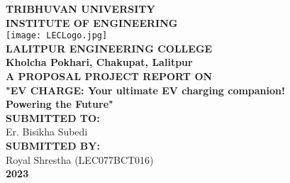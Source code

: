 {
	\thispagestyle{empty}
	\centering
   \fontsize{14pt}{14pt}\selectfont
        	\textbf{\MakeUppercase{Tribhuvan University}}\\
        	\textbf{\MakeUppercase{INSTITUTE OF ENGINEERING}}\\[0.5cm]
        	\texttt{[image: LECLogo.jpg]}\\[0.3cm]
        	\textbf{\MakeUppercase{Lalitpur Engineering College}}\\
    	\textbf{Kholcha Pokhari, Chakupat, Lalitpur}\\[1.4cm]
    	
    	\textbf{\MakeUppercase{A proposal project report on}}\\
    	\textbf{"\MakeUppercase{ev charge}: Your ultimate EV charging companion! \\ Powering the Future"}\\[2cm]
    
    	
    	\textbf{\MakeUppercase{Submitted To:}}\\
    	{Er. Bisikha Subedi}\\[1.2cm]
    	\textbf{\MakeUppercase{Submitted By:}}\\
            {
        	{{Royal Shrestha (LEC077BCT016)}}\\[1.2cm]
            }	
        \vspace{1.5in}
    	\textbf{2023}\\
}